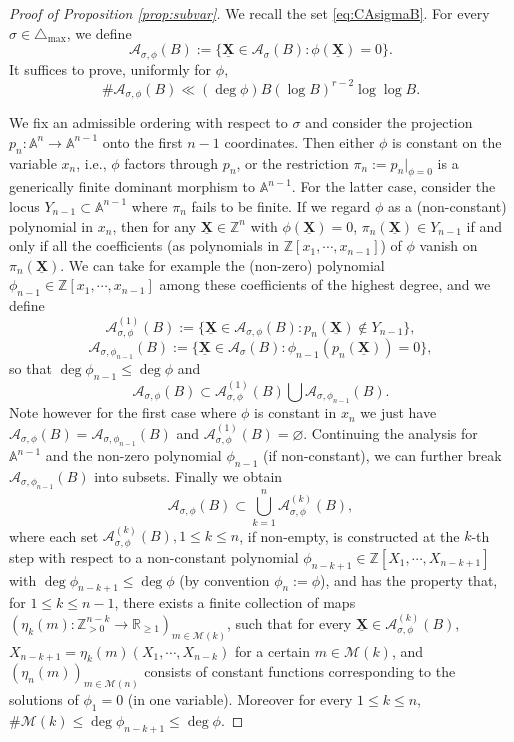 \documentclass[11pt,letterpaper]{amsart}
\newcommand{\BA}{{\mathbb {A}}}
\newcommand{\BR}{{\mathbb {R}}}
\newcommand{\BZ}{{\mathbb {Z}}}
\newcommand{\CA}{{\mathcal {A}}}
\newcommand{\CM}{{\mathcal {M}}}
\newcommand{\XX}{\underline{\mathbf{X}}}
\theoremstyle{plain}
\numberwithin{equation}{section}
\theoremstyle{definition}
\theoremstyle{remark}
\begin{document}
\begin{proof}[Proof of Proposition \ref{prop:subvar}]
	We recall the set  \eqref{eq:CAsigmaB}. For every $\sigma\in\triangle_{\max}$, we define $$\CA_{\sigma,\phi}(B):=\{\XX\in\CA_\sigma(B): \phi(\XX)=0\}.$$ It suffices to prove,  uniformly for $\phi$, 
\begin{equation}\label{eq:CAsigmaphi}
	\#\CA_{\sigma,\phi}(B)\ll (\deg \phi)B(\log B)^{r-2}\log\log B.
\end{equation}

	We fix an admissible ordering with respect to $\sigma$ and consider the projection $p_n:\BA^n\to\BA^{n-1}$ onto the first $n-1$ coordinates. Then either $\phi$ is constant on the variable $x_{n}$, i.e., $\phi$ factors through $p_n$, or the restriction $\pi_n:=p_n|_{\phi=0}$ is a generically finite dominant morphism to $\BA^{n-1}$. For the latter case, consider the locus $Y_{n-1}\subset\BA^{n-1}$ where $\pi_n$ fails to be finite. If we regard $\phi$ as a (non-constant) polynomial in $x_n$, then for any $\XX\in\BZ^n$ with $\phi(\XX)=0$, $\pi_n(\XX)\in Y_{n-1}$ if and only if all the coefficients (as polynomials in $\BZ[x_1,\cdots,x_{n-1}]$) of $\phi$ vanish on $\pi_n(\XX)$. We can take for example the (non-zero) polynomial $\phi_{n-1}\in\BZ[x_1,\cdots,x_{n-1}]$ among these coefficients of the highest degree, and we define
	$$\CA_{\sigma,\phi}^{(1)}(B):=\{\XX\in\CA_{\sigma,\phi}(B):p_n(\XX)\not\in Y_{n-1}\},$$
	$$\CA_{\sigma,\phi_{n-1}}(B):=\{\XX\in\CA_\sigma(B):\phi_{n-1}(p_n(\XX))=0\},$$
	so that $\deg\phi_{n-1}\leqslant \deg\phi$ and $$\CA_{\sigma,\phi}(B)\subset\CA_{\sigma,\phi}^{(1)}(B)\bigcup \CA_{\sigma,\phi_{n-1}}(B).$$ Note however for the first case where $\phi$ is constant in $x_n$ we just have  $\CA_{\sigma,\phi}(B)=\CA_{\sigma,\phi_{n-1}}(B)$ and $\CA_{\sigma,\phi}^{(1)}(B)=\varnothing$.
	Continuing the analysis for $\BA^{n-1}$ and the non-zero polynomial $\phi_{n-1}$ (if non-constant), we can further break $\CA_{\sigma,\phi_{n-1}}(B)$ into subsets. Finally we obtain 
	\begin{equation}\label{eq:decompCABf}
		\CA_{\sigma,\phi}(B)\subset \bigcup_{k=1}^{n}\CA_{\sigma,\phi}^{(k)}(B),
	\end{equation}
	where each set $\CA_{\sigma,\phi}^{(k)}(B),1\leqslant k\leqslant n$, if non-empty, is constructed  at the $k$-th step with respect to a non-constant polynomial $\phi_{n-k+1}\in\BZ[X_1,\cdots,X_{n-k+1}]$ with $\deg \phi_{n-k+1}\leqslant \deg \phi$ (by convention $\phi_n:=\phi$), and has the property that,  for $1\leqslant k\leqslant n-1$, there exists a finite collection of maps $(\eta_{k}(m):\BZ_{>0}^{n-k}\to\BR_{\geqslant 1})_{m\in \CM(k)}$, such that for every $\XX\in\CA_{\sigma,\phi}^{(k)}(B)$,  $X_{n-k+1}=\eta_{k}(m)(X_1,\cdots,X_{n-k})$ for a certain $m\in \CM(k)$, and $(\eta_{n}(m))_{m\in\CM(n)}$ consists of constant functions corresponding to the solutions of $\phi_1=0$ (in one variable). Moreover for every $1\leqslant k\leqslant n$,  $\#\CM(k)\leqslant\deg \phi_{n-k+1}\leqslant\deg \phi$.
	

\end{proof}
\end{document}
